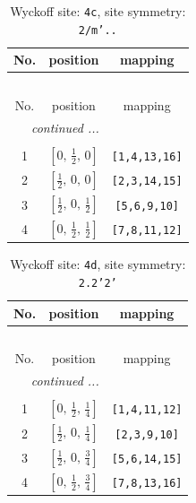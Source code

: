 \documentclass[fleqn,8pt]{jsarticle}
\begin{document}
\renewcommand{\arraystretch}{1.2}
\begin{longtable}{ccc}
\caption{Wyckoff site: {\tt 4c}, site symmetry: {\tt 2/m'..}}
 \\
 \hline \hline
No. & position & mapping \\ \hline \endfirsthead

\multicolumn{2}{l}{\tablename\ \thetable{}} \\
 \hline \hline
No. & position & mapping \\ \hline \endhead

 \hline \hline
\multicolumn{2}{r}{\footnotesize\it continued ...} \\ \endfoot

 \hline \hline
\multicolumn{2}{r}{} \\ \endlastfoot

1 & $\left[ 0,\, \frac{1}{2},\, 0 \right]$ & {\tt [1,4,13,16]} \\ \hline
2 & $\left[ \frac{1}{2},\, 0,\, 0 \right]$ & {\tt [2,3,14,15]} \\ \hline
3 & $\left[ \frac{1}{2},\, 0,\, \frac{1}{2} \right]$ & {\tt [5,6,9,10]} \\ \hline
4 & $\left[ 0,\, \frac{1}{2},\, \frac{1}{2} \right]$ & {\tt [7,8,11,12]} \\
\end{longtable}
\renewcommand{\arraystretch}{1.2}
\begin{longtable}{ccc}
\caption{Wyckoff site: {\tt 4d}, site symmetry: {\tt 2.2'2'}}
 \\
 \hline \hline
No. & position & mapping \\ \hline \endfirsthead

\multicolumn{2}{l}{\tablename\ \thetable{}} \\
 \hline \hline
No. & position & mapping \\ \hline \endhead

 \hline \hline
\multicolumn{2}{r}{\footnotesize\it continued ...} \\ \endfoot

 \hline \hline
\multicolumn{2}{r}{} \\ \endlastfoot

1 & $\left[ 0,\, \frac{1}{2},\, \frac{1}{4} \right]$ & {\tt [1,4,11,12]} \\ \hline
2 & $\left[ \frac{1}{2},\, 0,\, \frac{1}{4} \right]$ & {\tt [2,3,9,10]} \\ \hline
3 & $\left[ \frac{1}{2},\, 0,\, \frac{3}{4} \right]$ & {\tt [5,6,14,15]} \\ \hline
4 & $\left[ 0,\, \frac{1}{2},\, \frac{3}{4} \right]$ & {\tt [7,8,13,16]} \\
\end{longtable}
\end{document}
